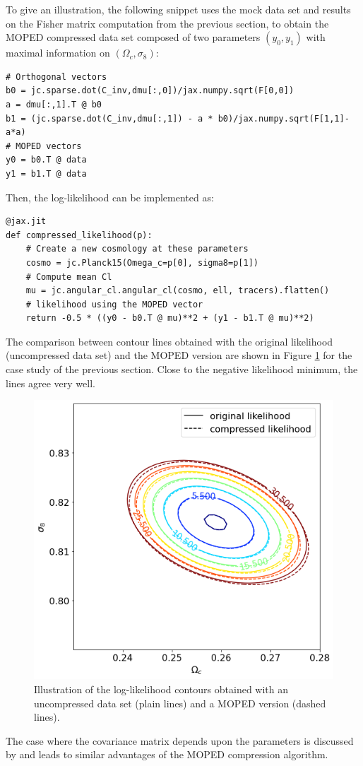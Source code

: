 \documentclass[twocolumn,twocolappendix,nofootinbib,iop]{openjournal}
\begin{document}
To give an illustration, the following snippet uses the mock data set and results on the Fisher matrix computation from the previous section, to obtain the MOPED compressed data set composed of two parameters $(y_0,y_1)$ with maximal information on $(\Omega_c, \sigma_8)$:  
\begin{lstlisting}[language=iPython]
# Orthogonal vectors
b0 = jc.sparse.dot(C_inv,dmu[:,0])/jax.numpy.sqrt(F[0,0])
a = dmu[:,1].T @ b0
b1 = (jc.sparse.dot(C_inv,dmu[:,1]) - a * b0)/jax.numpy.sqrt(F[1,1]-a*a)
# MOPED vectors
y0 = b0.T @ data
y1 = b1.T @ data
\end{lstlisting}
Then, the log-likelihood can be implemented as:
\begin{lstlisting}[language=iPython]
@jax.jit
def compressed_likelihood(p):
    # Create a new cosmology at these parameters
    cosmo = jc.Planck15(Omega_c=p[0], sigma8=p[1])
    # Compute mean Cl
    mu = jc.angular_cl.angular_cl(cosmo, ell, tracers).flatten()
    # likelihood using the MOPED vector
    return -0.5 * ((y0 - b0.T @ mu)**2 + (y1 - b1.T @ mu)**2)
\end{lstlisting}
The comparison between contour lines obtained with the original likelihood (uncompressed data set) and the MOPED version are shown in Figure \ref{fig:moped} for the case study of the previous section. Close to the negative likelihood minimum, the lines agree very well.
\begin{figure}
    \centering
    \includegraphics[width=\columnwidth]{figures/moped.png}
    \caption{Illustration of the log-likelihood contours obtained with an uncompressed data set (plain lines) and a MOPED version (dashed lines).} 
    \label{fig:moped}
\end{figure}
%
The case where the covariance matrix depends upon the parameters is discussed by  \citet{2017MNRAS.472.4244H} and leads to similar advantages of the MOPED compression algorithm.
\end{document}
